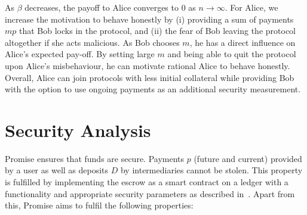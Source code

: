 \documentclass[runningheads]{llncs}
\newcommand{\sys}{Promise\xspace}
\begin{document}


As $\beta$ decreases, the payoff to Alice converges to $0$ as $n \rightarrow \infty$.
For Alice, we increase the motivation to behave honestly by (i) providing a sum of payments $mp$ that Bob locks in the protocol, and (ii) the fear of Bob leaving the protocol altogether if she acts malicious. %
As Bob chooses $m$, he has a direct influence on Alice's expected pay-off.
By setting large $m$ and being able to quit the protocol upon Alice's misbehaviour, he can motivate rational Alice to behave honestly.
Overall, Alice can join protocols with less initial collateral while providing Bob with the option to use ongoing payments as an additional security measurement.




\section{Security Analysis}
\label{sec:security}

\sys ensures that funds are secure. 
Payments $p$ (future and current) provided by a user as well as deposits $D$ by intermediaries cannot be stolen. This property is fulfilled by implementing the escrow as a smart contract on a ledger with a functionality and appropriate security parameters as described in~\cite{garay2016bitcoin,gervais2016security}. 
Apart from this, \sys aims to fulfil the following properties:
\end{document}
